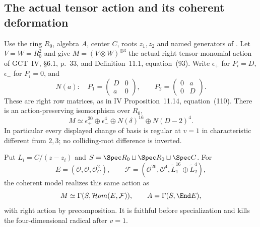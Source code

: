 \subsection{The actual tensor action and its coherent deformation}
\begin{finding}\label{f:r3tensor}
Use the ring $R_0$, algebra $A$, center $C$, roots $z_1,z_2$ and named
generators of . Let $V=W=R_0^2$ and give
$M=(V\otimes W)^{\otimes3}$ the actual right tensor-monomial action of
GCT~IV, \S6.1, p.~33, and Definition~11.1, equation~(93). Write
$\epsilon_+$ for $P_i=D$, $\epsilon_-$ for $P_i=0$, and
\[
 N(a):\quad P_1=\begin{pmatrix}D&0\\a&0\end{pmatrix},\qquad
 P_2=\begin{pmatrix}0&a\\0&D\end{pmatrix}.
\]
These are right row matrices, as in IV Proposition~11.14,
equation~(110). There is an action-preserving isomorphism over $R_0$,
\begin{equation}\label{eq:r3tensor}
 M\simeq\epsilon_+^{20}\oplus\epsilon_-^4
       \oplus N(\delta)^{16}\oplus N(D-2)^4.
\end{equation}
In particular every displayed change of basis is regular at $v=1$ in
characteristic different from $2,3$; no colliding-root difference is inverted.

Put $L_i=C/(z-z_i)$ and
$S=\Spec R_0\sqcup\Spec R_0\sqcup\Spec C$. For
\[
 E=(\mathcal O,\mathcal O,\mathcal O_C^2),\qquad
 \mathcal F=(\mathcal O^{20},\mathcal O^4,
             \widetilde L_1^{16}\oplus\widetilde L_2^4),
\]
the coherent model realizes this same action as
\[
 M\simeq\Gamma(S,\mathcal Hom(E,\mathcal F)),\qquad A=\Gamma(S,\End E),
\]
with right action by precomposition. It is faithful before specialization
and kills the four-dimensional radical after $v=1$.
\end{finding}
